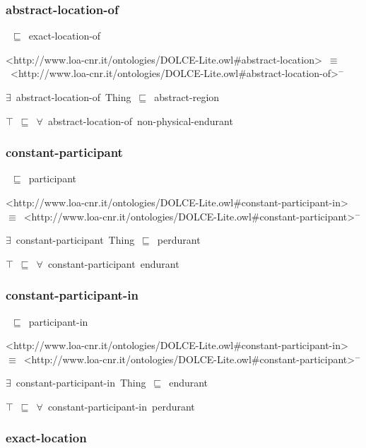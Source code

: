 \documentclass{article}
\begin{document}
\subsubsection*{abstract-location-of}

~\ensuremath{\sqsubseteq}~exact-location-of

<http://www.loa-cnr.it/ontologies/DOLCE-Lite.owl#abstract-location>~\ensuremath{\equiv}~<http://www.loa-cnr.it/ontologies/DOLCE-Lite.owl#abstract-location-of>\ensuremath{^-}

\ensuremath{\exists}~abstract-location-of~Thing~\ensuremath{\sqsubseteq}~abstract-region

\ensuremath{\top}~\ensuremath{\sqsubseteq}~\ensuremath{\forall}~abstract-location-of~non-physical-endurant

\subsubsection*{constant-participant}

~\ensuremath{\sqsubseteq}~participant

<http://www.loa-cnr.it/ontologies/DOLCE-Lite.owl#constant-participant-in>~\ensuremath{\equiv}~<http://www.loa-cnr.it/ontologies/DOLCE-Lite.owl#constant-participant>\ensuremath{^-}

\ensuremath{\exists}~constant-participant~Thing~\ensuremath{\sqsubseteq}~perdurant

\ensuremath{\top}~\ensuremath{\sqsubseteq}~\ensuremath{\forall}~constant-participant~endurant

\subsubsection*{constant-participant-in}

~\ensuremath{\sqsubseteq}~participant-in

<http://www.loa-cnr.it/ontologies/DOLCE-Lite.owl#constant-participant-in>~\ensuremath{\equiv}~<http://www.loa-cnr.it/ontologies/DOLCE-Lite.owl#constant-participant>\ensuremath{^-}

\ensuremath{\exists}~constant-participant-in~Thing~\ensuremath{\sqsubseteq}~endurant

\ensuremath{\top}~\ensuremath{\sqsubseteq}~\ensuremath{\forall}~constant-participant-in~perdurant

\subsubsection*{exact-location}
\end{document}
